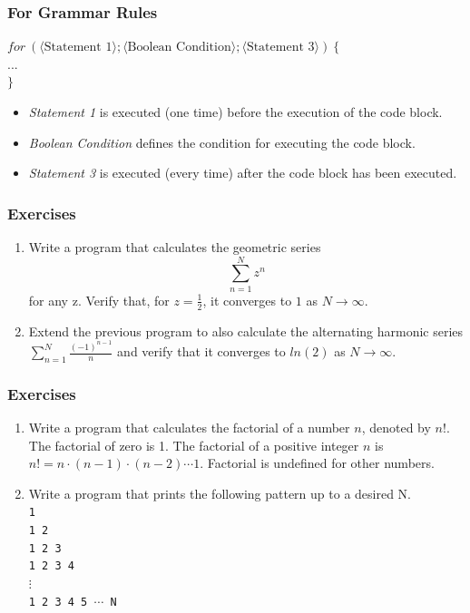 \documentclass{beamer}
\newcommand{\cindent}{\hskip20pt}
\begin{document}
	\begin{frame}
		\frametitle{For Grammar Rules}
		$for\ (\langle \text{Statement 1} \rangle; \langle \text{Boolean Condition} \rangle; \langle \text{Statement 3} \rangle)\ \{$\\
			\cindent $...$\\
		$\}$\\
		\begin{itemize}
			\item \emph{Statement 1} is executed (one time) before the execution of the code block.
			\item \emph{Boolean Condition} defines the condition for executing the code block.
			\item \emph{Statement 3} is executed (every time) after the code block has been executed.
		\end{itemize}
	\end{frame}

	\begin{frame}
		\frametitle{Exercises}
		\begin{enumerate}
			\item Write a program that calculates the geometric series \[\sum_{n=1}^{N}{z^n}\] for any z. Verify that, for $z=\frac{1}{2}$, it converges to $1$ as $N \to \infty$.
			\pause
			\item Extend the previous program to also calculate the alternating harmonic series $ \sum_{n=1}^{N}{\frac{(-1)^{n-1}}{n}}$ and verify that it converges to $ln(2)$ as $N \to \infty$.
		\end{enumerate}
	\end{frame}

	\begin{frame}
		\frametitle{Exercises}
		\begin{enumerate}
			\item Write a program that calculates the factorial of a number $n$, denoted by $n!$. The factorial of zero is 1. The factorial of a positive integer $n$ is $n! = n \cdot (n-1) \cdot (n-2) \cdots 1$. Factorial is undefined for other numbers.
			\pause
			\item Write a program that prints the following pattern up to a desired N.\\
			\texttt{1\\
				1 2\\
				1 2 3\\
				1 2 3 4\\
				$\vdots$\\
				1 2 3 4 5 $\cdots$ N}
		\end{enumerate}
	\end{frame}
\end{document}
